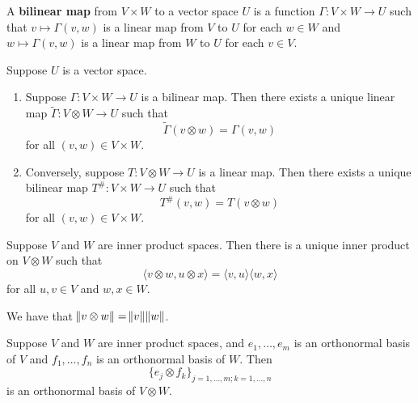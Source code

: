 \documentclass{extarticle}
\begin{document}
\begin{definition}
    A \textbf{bilinear map} from \(V \times W\) to a vector space \(U\) is a function 
    \(\Gamma \colon V \times W \to U\) such that \(v \mapsto \Gamma(v, w)\) is a linear map 
    from \(V\) to \(U\) for each \(w \in W\) and \(w \mapsto \Gamma(v, w)\) is a linear map 
    from \(W\) to \(U\) for each \(v \in V\).
\end{definition}

\begin{lemma}
    Suppose \(U\) is a vector space. 

    \begin{enumerate}[label=(\alph*)]
        \item Suppose \(\Gamma \colon V \times W \to U\) is a bilinear map. Then there exists 
        a unique linear map \(\tilde{\Gamma} \colon V \otimes W \to U\) such that 
        \[\tilde{\Gamma} (v \otimes w) = \Gamma(v, w)\]
        for all \((v, w) \in V \times W\).
        
        \item Conversely, suppose \(T \colon V \otimes W \to U\) is a linear map. Then there 
        exists a unique bilinear map \(T^{\#} \colon V \times W \to U\) such that 
        \[T^{\#} (v, w) = T(v \otimes w)\]
        for all \((v, w) \in V \times W\).
    \end{enumerate}
\end{lemma}


\begin{thm}
    Suppose \(V\) and \(W\) are inner product spaces. Then there is a unique inner product 
    on \(V \otimes W\) such that 
    \[\langle v \otimes w, u \otimes x \rangle = \langle v,u \rangle \langle w,x \rangle\]
    for all \(u, v \in V\) and \(w, x \in W\).
\end{thm}


\begin{remark}
    We have that \(\norm{v \otimes w} = \norm{v} \norm{w}\).
\end{remark}

\begin{corollary}
    Suppose \(V\) and \(W\) are inner product spaces, and \(e_1, \ldots, e_m\) is an orthonormal 
    basis of \(V\) and \(f_1, \ldots, f_n\) is an orthonormal basis of \(W\). Then 
    \[ \{e_j \otimes f_k\}_{j = 1, \ldots, m;k=1, \ldots, n}\]
    is an orthonormal basis of \(V \otimes W\).
\end{corollary}
\end{document}
